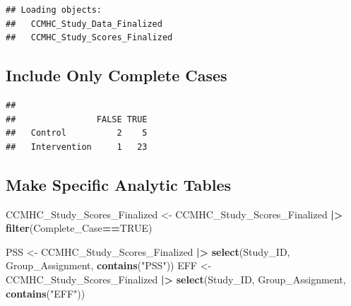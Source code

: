 \documentclass[
]{article}
\newenvironment{Shaded}{\begin{snugshade}}{\end{snugshade}}
\newcommand{\AttributeTok}[1]{\textcolor[rgb]{0.13,0.29,0.53}{#1}}
\newcommand{\CommentTok}[1]{\textcolor[rgb]{0.56,0.35,0.01}{\textit{#1}}}
\newcommand{\ConstantTok}[1]{\textcolor[rgb]{0.56,0.35,0.01}{#1}}
\newcommand{\FunctionTok}[1]{\textcolor[rgb]{0.13,0.29,0.53}{\textbf{#1}}}
\newcommand{\NormalTok}[1]{#1}
\newcommand{\OtherTok}[1]{\textcolor[rgb]{0.56,0.35,0.01}{#1}}
\newcommand{\SpecialCharTok}[1]{\textcolor[rgb]{0.81,0.36,0.00}{\textbf{#1}}}
\newcommand{\StringTok}[1]{\textcolor[rgb]{0.31,0.60,0.02}{#1}}
\begin{document}
\begin{verbatim}
## Loading objects:
##   CCMHC_Study_Data_Finalized
##   CCMHC_Study_Scores_Finalized
\end{verbatim}

\subsection{Include Only Complete
Cases}\label{include-only-complete-cases}

\begin{Shaded}
\end{Shaded}

\begin{verbatim}
##               
##                FALSE TRUE
##   Control          2    5
##   Intervention     1   23
\end{verbatim}

\subsection{Make Specific Analytic
Tables}\label{make-specific-analytic-tables}

\begin{Shaded}
\begin{Highlighting}[]
\NormalTok{CCMHC\_Study\_Scores\_Finalized }\OtherTok{\textless{}{-}}\NormalTok{ CCMHC\_Study\_Scores\_Finalized }\SpecialCharTok{|\textgreater{}} \FunctionTok{filter}\NormalTok{(Complete\_Case}\SpecialCharTok{==}\ConstantTok{TRUE}\NormalTok{)}


\NormalTok{PSS }\OtherTok{\textless{}{-}}\NormalTok{ CCMHC\_Study\_Scores\_Finalized }\SpecialCharTok{|\textgreater{}} \FunctionTok{select}\NormalTok{(Study\_ID, Group\_Assignment, }\FunctionTok{contains}\NormalTok{(}\StringTok{"PSS"}\NormalTok{))}
\NormalTok{EFF }\OtherTok{\textless{}{-}}\NormalTok{ CCMHC\_Study\_Scores\_Finalized }\SpecialCharTok{|\textgreater{}} \FunctionTok{select}\NormalTok{(Study\_ID, Group\_Assignment, }\FunctionTok{contains}\NormalTok{(}\StringTok{"EFF"}\NormalTok{))}
\end{Highlighting}
\end{Shaded}
\end{document}
